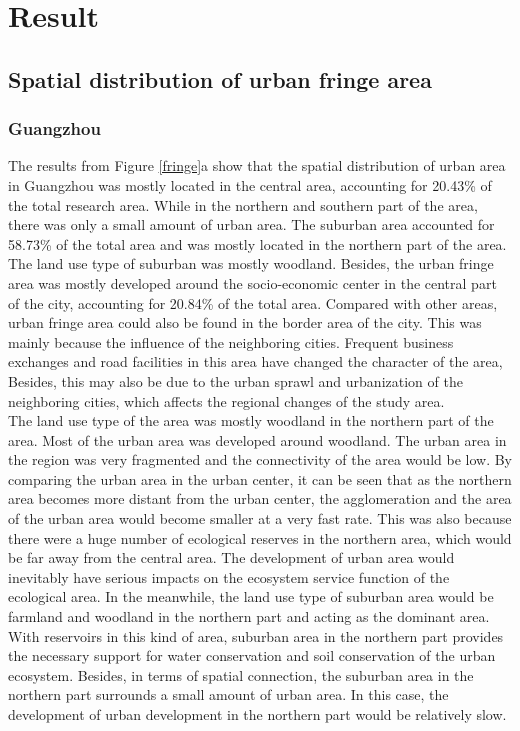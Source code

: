\section{Result}

\subsection{Spatial distribution of urban fringe area}
\subsubsection{Guangzhou}
The results from Figure \ref{fringe}a show that the spatial distribution of urban area in Guangzhou was mostly located in the central area, accounting for 20.43\% of the total research area. While in the northern and southern part of the area, there was only a small amount of urban area. The suburban area accounted for 58.73\% of the total area and was mostly located in the northern part of the area. The land use type of suburban was mostly woodland. Besides, the urban fringe area was mostly developed around the socio-economic center in the central part of the city, accounting for 20.84\% of the total area. Compared with other areas, urban fringe area could also be found in the border area of the city. This was mainly because the influence of the neighboring cities. Frequent business exchanges and road facilities in this area have changed the character of the area, Besides, this may also be due to the urban sprawl and urbanization of the neighboring cities, which affects the regional changes of the study area.\\

The land use type of the area was mostly woodland in the northern part of the area. Most of the urban area was developed around woodland. The urban area in the region was very fragmented and the connectivity of the area would be low. By comparing the urban area in the urban center, it can be seen that as the northern area becomes more distant from the urban center, the agglomeration and the area of the urban area would become smaller at a very fast rate. This was also because there were a huge number of ecological reserves in the northern area, which would be far away from the central area. The development of urban area would inevitably have serious impacts on the ecosystem service function of the ecological area. In the meanwhile, the land use type of suburban area would be farmland and woodland in the northern part and acting as the dominant area. With reservoirs in this kind of area, suburban area in the northern part provides the necessary support for water conservation and soil conservation of the urban ecosystem. Besides, in terms of spatial connection, the suburban area in the northern part surrounds a small amount of urban area. In this case, the development of urban development in the northern part would be relatively slow.\\

